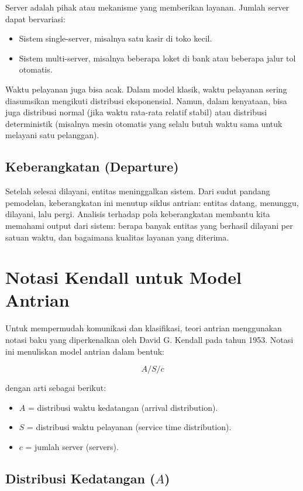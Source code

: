 \documentclass{bukumjh}
\begin{document}
Server adalah pihak atau mekanisme yang memberikan layanan. Jumlah server dapat bervariasi:
\begin{itemize}
    \item Sistem {\jsg single-server}, misalnya satu kasir di toko kecil.
    \item Sistem {\jsg multi-server}, misalnya beberapa loket di bank atau beberapa jalur tol otomatis.
\end{itemize}

Waktu pelayanan juga bisa acak. Dalam model klasik, waktu pelayanan sering diasumsikan mengikuti distribusi eksponensial. Namun, dalam kenyataan, bisa juga distribusi normal (jika waktu rata-rata relatif stabil) atau distribusi deterministik (misalnya mesin otomatis yang selalu butuh waktu sama untuk melayani satu pelanggan).

\subsection{Keberangkatan (Departure)}

Setelah selesai dilayani, entitas meninggalkan sistem. Dari sudut pandang pemodelan, keberangkatan ini menutup siklus antrian: entitas datang, menunggu, dilayani, lalu pergi. Analisis terhadap pola keberangkatan membantu kita memahami {\jsg output} dari sistem: berapa banyak entitas yang berhasil dilayani per satuan waktu, dan bagaimana kualitas layanan yang diterima.

\section{Notasi Kendall untuk Model Antrian}

Untuk mempermudah komunikasi dan klasifikasi, teori antrian menggunakan notasi baku yang diperkenalkan oleh David G. Kendall pada tahun 1953. Notasi ini menuliskan model antrian dalam bentuk:

\[
A/S/c
\]

dengan arti sebagai berikut:
\begin{itemize}
    \item $A$ = distribusi waktu kedatangan (arrival distribution).
    \item $S$ = distribusi waktu pelayanan (service time distribution).
    \item $c$ = jumlah server (servers).
\end{itemize}

\subsection{Distribusi Kedatangan ($A$)}
\end{document}
